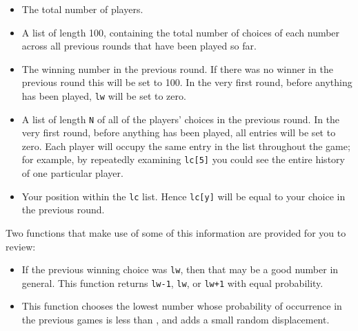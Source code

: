 \documentclass[12pt]{amsart}
\begin{document}
\begin{itemize}
  \item[\texttt{N}] The total number of players. \\
  \item[\texttt{history}] A list of length 100, containing the total number of
    choices of each number across all previous rounds that have been played so
    far.\\
  \item[\texttt{lw}] The winning number in the previous round. If there was no
    winner in the previous round this will be set to 100. In the very first
    round, before anything has been played, \texttt{lw} will be set to zero.\\
  \item[\texttt{lc}] A list of length \texttt{N} of all of the players' choices
    in the previous round. In the very first round, before anything has been
    played, all entries will be set to zero. Each player will occupy the same
    entry in the list throughout the game; for example, by repeatedly examining
    \texttt{lc[5]} you could see the entire history of one particular player.\\
  \item[\texttt{y}] Your position within the \texttt{lc} list. Hence
    \texttt{lc[y]} will be equal to your choice in the previous round.
\end{itemize}

\bigskip
\noindent Two functions that make use of some of this information are
provided for you to review:\\
\begin{itemize}
  \item[\texttt{prev.m}] If the previous winning choice was
    \texttt{lw}, then that may be a good number in general. This function
    returns \texttt{lw-1}, \texttt{lw}, or \texttt{lw+1} with equal
    probability.\\
 \item[\texttt{histo.m}] This function chooses the lowest number whose
    probability of occurrence in the previous games is less than
    , and adds a small random displacement.\\
\end{itemize}
\bigskip
\end{document}
